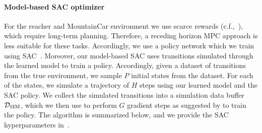 \paragraph{Model-based SAC optimizer}
For the reacher and MountainCar environment we use scarce rewards (c.f.,~), which require long-term planning. Therefore, a receding horizon MPC approach is less suitable for these tasks. Accordingly, we use a policy network which we train using SAC~\citep{sac}. Moreover, our model-based SAC uses transitions simulated through the learned model to train a policy. Accordingly, given a dataset of transitions from the true environment, we sample $P$ initial states from the dataset. For each of the states, we simulate a trajectory of $H$ steps using our learned model and the SAC policy. We collect the simulated transitions into a simulation data buffer ${\mathcal{D}}_{\text{SIM}}$, which we then use to perform $G$ gradient steps as suggested by \cite{sac} to train the policy. The algorithm is summarized below, and we provide the SAC hyperparameters in~.
\begin{algorithm}[H]
    \caption*{\textbf{Model-based SAC}}
    \begin{algorithmic}[]
              \ENDFOR
        \ENDFOR
    \end{algorithmic}
\end{algorithm}
